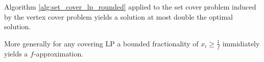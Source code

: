 \begin{kor}
    Algorithm \ref{alg:set_cover_lp_rounded} applied to the set cover problem induced by the vertex cover problem yields a solution at most double the optimal solution.
    \begin{note}
        More generally for any covering LP a bounded fractionality of $x_i \ge \frac{1}{f}$ immidiately yields a $f$-approximation.
    \end{note}
\end{kor}


